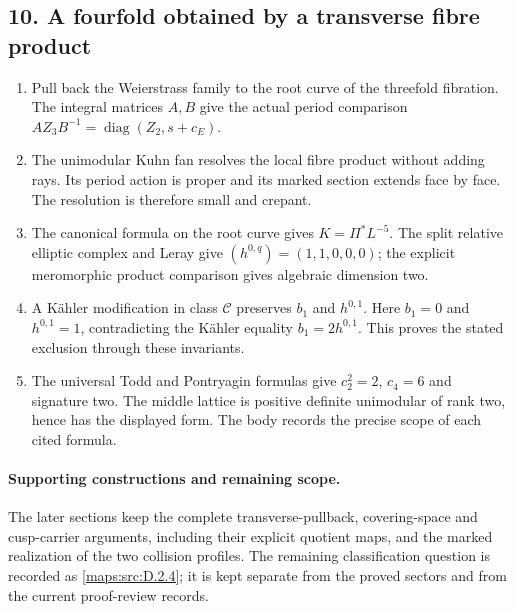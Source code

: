 \subsection*{10. A fourfold obtained by a transverse fibre product}
\RungOne
\begin{enumerate}[label=\arabic*.,leftmargin=*]
\item Pull back the Weierstrass family to the root curve of the
threefold fibration.  The integral matrices $A,B$ give the actual
period comparison $AZ_3B^{-1}=\operatorname{diag}(Z_2,s+c_E)$.
\item The unimodular Kuhn fan resolves the local fibre product
without adding rays.  Its period action is proper and its marked
section extends face by face.  The resolution is therefore small
and crepant.
\item The canonical formula on the root curve gives
$K=\Pi^*L^{-5}$.  The split relative elliptic complex and Leray
give $(h^{0,q})=(1,1,0,0,0)$; the explicit meromorphic product
comparison gives algebraic dimension two.
\item A K\"ahler modification in class $\mathcal C$ preserves
$b_1$ and $h^{0,1}$.  Here $b_1=0$ and $h^{0,1}=1$, contradicting
the K\"ahler equality $b_1=2h^{0,1}$.  This proves the stated
exclusion through these invariants.
\item The universal Todd and Pontryagin formulas give
$c_2^2=2$, $c_4=6$ and signature two.  The middle lattice is
positive definite unimodular of rank two, hence has the displayed
form.  The body records the precise scope of each cited formula.
\end{enumerate}

\paragraph{Supporting constructions and remaining scope.}
The later sections keep the complete transverse-pullback,
covering-space and cusp-carrier arguments, including their explicit
quotient maps, and the marked realization of the two collision
profiles.  The remaining classification question is recorded as
\cref{maps:src:D.2.4}; it is kept separate from the proved sectors
and from the current proof-review records.
